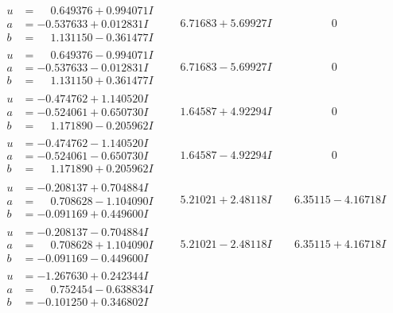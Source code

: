 \documentclass[1p]{elsarticle_modified}
\theoremstyle{definition}
\begin{document}
$$\begin{array}{c|c|c}
\begin{aligned}
u &= \phantom{-}0.649376 + 0.994071 I \\
a &= -0.537633 + 0.012831 I \\
b &= \phantom{-}1.131150 - 0.361477 I\end{aligned}
 & \phantom{-}6.71683 + 5.69927 I & \phantom{-0.000000 } 0 \\ \hline\begin{aligned}
u &= \phantom{-}0.649376 - 0.994071 I \\
a &= -0.537633 - 0.012831 I \\
b &= \phantom{-}1.131150 + 0.361477 I\end{aligned}
 & \phantom{-}6.71683 - 5.69927 I & \phantom{-0.000000 } 0 \\ \hline\begin{aligned}
u &= -0.474762 + 1.140520 I \\
a &= -0.524061 + 0.650730 I \\
b &= \phantom{-}1.171890 - 0.205962 I\end{aligned}
 & \phantom{-}1.64587 + 4.92294 I & \phantom{-0.000000 } 0 \\ \hline\begin{aligned}
u &= -0.474762 - 1.140520 I \\
a &= -0.524061 - 0.650730 I \\
b &= \phantom{-}1.171890 + 0.205962 I\end{aligned}
 & \phantom{-}1.64587 - 4.92294 I & \phantom{-0.000000 } 0 \\ \hline\begin{aligned}
u &= -0.208137 + 0.704884 I \\
a &= \phantom{-}0.708628 - 1.104090 I \\
b &= -0.091169 + 0.449600 I\end{aligned}
 & \phantom{-}5.21021 + 2.48118 I & \phantom{-}6.35115 - 4.16718 I \\ \hline\begin{aligned}
u &= -0.208137 - 0.704884 I \\
a &= \phantom{-}0.708628 + 1.104090 I \\
b &= -0.091169 - 0.449600 I\end{aligned}
 & \phantom{-}5.21021 - 2.48118 I & \phantom{-}6.35115 + 4.16718 I \\ \hline\begin{aligned}
u &= -1.267630 + 0.242344 I \\
a &= \phantom{-}0.752454 - 0.638834 I \\
b &= -0.101250 + 0.346802 I\end{aligned}

\end{array}$$
\end{document}
